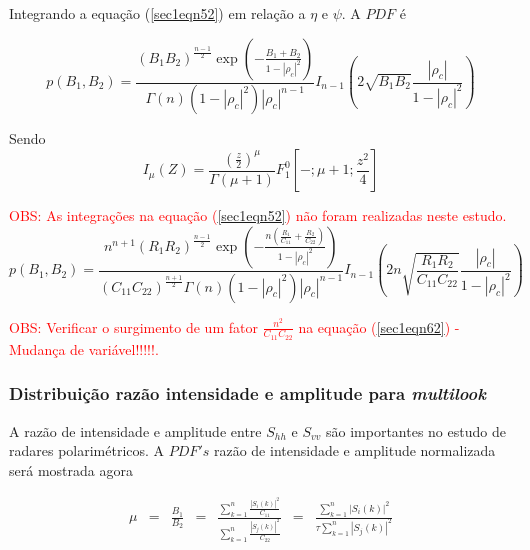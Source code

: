 \documentclass[10pt,a4paper]{article}
\begin{document}
Integrando a equação (\ref{sec1eqn52}) em relação a $\eta$ e $\psi$. A $PDF$ é

\begin{equation}\label{sec1eqn60}
	p(B_1,B_2)=\frac{\left(B_1B_2\right)^{\frac{n-1}{2}}\exp\left(-\frac{B_1+B_2}{1-\left|\rho_c\right|^2}\right)}{\Gamma(n)(1-\left|\rho_c\right|^2)|\rho_c|^{n-1}}I_{n-1}\left(2\sqrt{B_1B_2}\frac{|\rho_c|}{1-|\rho_c|^2}\right)
\end{equation}

Sendo
\begin{equation}\label{sec1eqn61}
	I_{\mu}(Z)=\frac{(\frac{z}{2})^{\mu}}{\Gamma(\mu+1)} F_{1}^{0}[-;\mu+1;\frac{z^2}{4}]
\end{equation}

\textcolor{red}{OBS: As integrações na equação (\ref{sec1eqn52}) não foram realizadas neste estudo.}
\begin{equation}\label{sec1eqn62}
	p(B_1,B_2)=\frac{n^{n+1}\left(R_1R_2\right)^{\frac{n-1}{2}}\exp\left(-\frac{n(\frac{R_1}{C_{11}}+\frac{R_2}{C_{22}})}{1-\left|\rho_c\right|^2}\right)}{(C_{11}C_{22})^{\frac{n+1}{2}}\Gamma(n)(1-\left|\rho_c\right|^2)|\rho_c|^{n-1}}I_{n-1}\left(2n\sqrt{\frac{R_1R_2}{C_{11}C_{22}}}\frac{|\rho_c|}{1-|\rho_c|^2}\right)
\end{equation}

\textcolor{red}{OBS: Verificar o surgimento de um fator $\frac{n^2}{C_{11}C_{22}}$ na equação  (\ref{sec1eqn62}) - Mudança de variável!!!!!.}

\subsubsection{Distribuição razão intensidade e amplitude para {\it multilook}}

A razão de intensidade e amplitude entre $S_{hh}$ e $S_{vv}$ são importantes no estudo de radares polarimétricos. A $PDF's$ razão de intensidade e amplitude normalizada será mostrada agora

\begin{equation}\label{sec1eqn63}
\begin{array}{ccccccc}
	\mu&=&\frac{B_1}{B_2}&=&\frac{\displaystyle{\sum_{k=1}^{n}\frac{|S_i(k)|^2}{C_{11}}}}{\displaystyle{\sum_{k=1}^{n}\frac{|S_j(k)|^2}{C_{22}}}}&=&\frac{\displaystyle{\sum_{k=1}^{n}|S_i(k)|^2}}{\tau\displaystyle{\sum_{k=1}^{n}|S_j(k)|^2}}\\
\end{array}
\end{equation}
\end{document}
